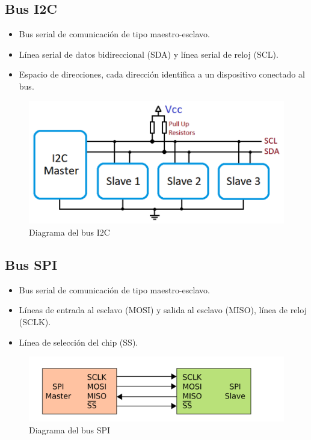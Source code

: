 \documentclass[12pt, twoside]{report}
\begin{document}
\subsection*{Bus I2C}
\begin{itemize}
	\item Bus serial de comunicación de tipo maestro-esclavo.
	\item Línea serial de datos bidireccional (SDA)  y línea serial de reloj (SCL).
	\item Espacio de direcciones, cada dirección identifica a un dispositivo conectado al bus.
\end{itemize}

\begin{figure}[htb]
	\centering
	\includegraphics[scale=0.5]{i2c.png}
	\caption{Diagrama del bus I2C}
\end{figure}

\subsection*{Bus SPI}
\begin{itemize}
	\item Bus serial de comunicación de tipo maestro-esclavo.
	\item Líneas de entrada al esclavo (MOSI) y salida al esclavo (MISO), línea de reloj (SCLK).
	\item Línea de selección del chip (SS).
\end{itemize}

\begin{figure}[htb]
	\centering
	\includegraphics[scale=0.5]{spi.png}
	\caption{Diagrama del bus SPI}
\end{figure}
\end{document}
